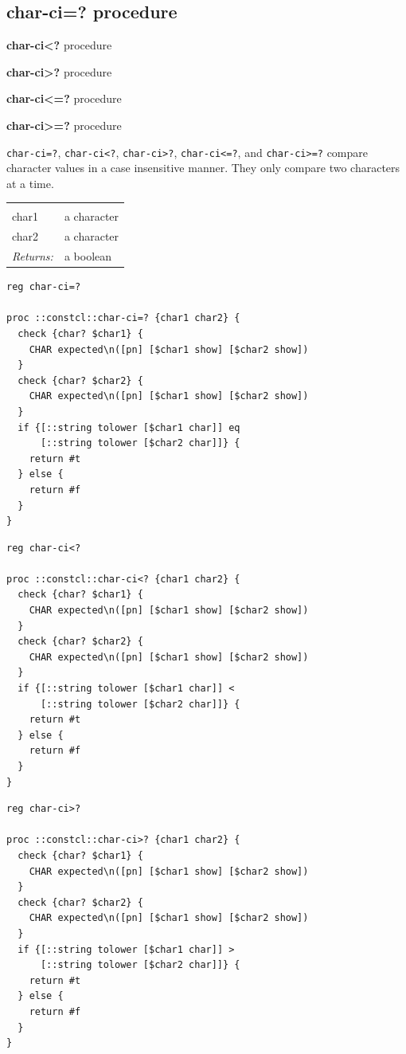 \documentclass[twoside,9pt]{report}
\begin{document}
\subsection{char-ci=? procedure}
\label{char-ci=?-procedure}


\textbf{char-ci<?} procedure


\textbf{char-ci>?} procedure


\textbf{char-ci<=?} procedure


\textbf{char-ci>=?} procedure


\texttt{char-ci=?}, \texttt{char-ci<?}, \texttt{char-ci>?}, \texttt{char-ci<=?}, and \texttt{char-ci>=?} compare character values in a case insensitive manner. They only compare two characters at a time.

\noindent\begin{tabular}{ |p{1.5cm} p{8cm}| }
\hline
\rowcolor[HTML]{CCCCCC} \multicolumn{2}{|l|}{\bf char-ci=?, char-ci<?, char-ci>?, char-ci<=?, char-ci>=? (public)} \\
char1 & a character \\
char2 & a character \\
\textit{Returns:} & a boolean \\
\hline
\end{tabular}
\begin{lstlisting}
reg char-ci=?
 
proc ::constcl::char-ci=? {char1 char2} {
  check {char? $char1} {
    CHAR expected\n([pn] [$char1 show] [$char2 show])
  }
  check {char? $char2} {
    CHAR expected\n([pn] [$char1 show] [$char2 show])
  }
  if {[::string tolower [$char1 char]] eq
      [::string tolower [$char2 char]]} {
    return #t
  } else {
    return #f
  }
}
\end{lstlisting}
\begin{lstlisting}
reg char-ci<?
 
proc ::constcl::char-ci<? {char1 char2} {
  check {char? $char1} {
    CHAR expected\n([pn] [$char1 show] [$char2 show])
  }
  check {char? $char2} {
    CHAR expected\n([pn] [$char1 show] [$char2 show])
  }
  if {[::string tolower [$char1 char]] <
      [::string tolower [$char2 char]]} {
    return #t
  } else {
    return #f
  }
}
\end{lstlisting}
\begin{lstlisting}
reg char-ci>?
 
proc ::constcl::char-ci>? {char1 char2} {
  check {char? $char1} {
    CHAR expected\n([pn] [$char1 show] [$char2 show])
  }
  check {char? $char2} {
    CHAR expected\n([pn] [$char1 show] [$char2 show])
  }
  if {[::string tolower [$char1 char]] >
      [::string tolower [$char2 char]]} {
    return #t
  } else {
    return #f
  }
}
\end{lstlisting}
\end{document}
